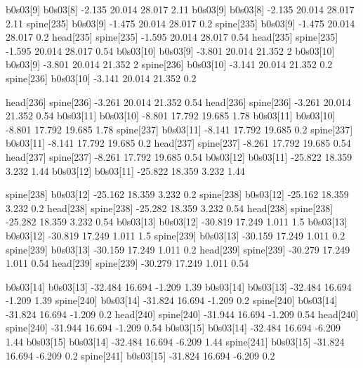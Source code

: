 b0s03[9]    b0s03[8]    -2.135    20.014    28.017    2.11
b0s03[9]    b0s03[8]    -2.135    20.014    28.017    2.11
spine[235]    b0s03[9]    -1.475    20.014    28.017    0.2
spine[235]    b0s03[9]    -1.475    20.014    28.017    0.2
head[235]    spine[235]    -1.595    20.014    28.017    0.54
head[235]    spine[235]    -1.595    20.014    28.017    0.54
b0s03[10]    b0s03[9]    -3.801    20.014    21.352    2
b0s03[10]    b0s03[9]    -3.801    20.014    21.352    2
spine[236]    b0s03[10]    -3.141    20.014    21.352    0.2
spine[236]    b0s03[10]    -3.141    20.014    21.352    0.2


head[236]    spine[236]    -3.261    20.014    21.352    0.54
head[236]    spine[236]    -3.261    20.014    21.352    0.54
b0s03[11]    b0s03[10]    -8.801    17.792    19.685    1.78
b0s03[11]    b0s03[10]    -8.801    17.792    19.685    1.78
spine[237]    b0s03[11]    -8.141    17.792    19.685    0.2
spine[237]    b0s03[11]    -8.141    17.792    19.685    0.2
head[237]    spine[237]    -8.261    17.792    19.685    0.54
head[237]    spine[237]    -8.261    17.792    19.685    0.54
b0s03[12]    b0s03[11]    -25.822    18.359    3.232    1.44
b0s03[12]    b0s03[11]    -25.822    18.359    3.232    1.44


spine[238]    b0s03[12]    -25.162    18.359    3.232    0.2
spine[238]    b0s03[12]    -25.162    18.359    3.232    0.2
head[238]    spine[238]    -25.282    18.359    3.232    0.54
head[238]    spine[238]    -25.282    18.359    3.232    0.54
b0s03[13]    b0s03[12]    -30.819    17.249    1.011    1.5
b0s03[13]    b0s03[12]    -30.819    17.249    1.011    1.5
spine[239]    b0s03[13]    -30.159    17.249    1.011    0.2
spine[239]    b0s03[13]    -30.159    17.249    1.011    0.2
head[239]    spine[239]    -30.279    17.249    1.011    0.54
head[239]    spine[239]    -30.279    17.249    1.011    0.54


b0s03[14]    b0s03[13]    -32.484    16.694    -1.209    1.39
b0s03[14]    b0s03[13]    -32.484    16.694    -1.209    1.39
spine[240]    b0s03[14]    -31.824    16.694    -1.209    0.2
spine[240]    b0s03[14]    -31.824    16.694    -1.209    0.2
head[240]    spine[240]    -31.944    16.694    -1.209    0.54
head[240]    spine[240]    -31.944    16.694    -1.209    0.54
b0s03[15]    b0s03[14]    -32.484    16.694    -6.209    1.44
b0s03[15]    b0s03[14]    -32.484    16.694    -6.209    1.44
spine[241]    b0s03[15]    -31.824    16.694    -6.209    0.2
spine[241]    b0s03[15]    -31.824    16.694    -6.209    0.2


